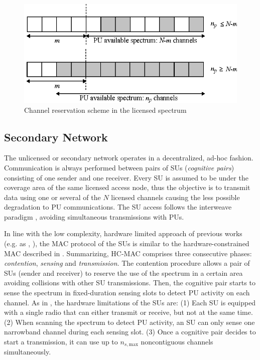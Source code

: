 \begin{figure}[ht]
\centering
\includegraphics[scale=0.9]{channelReservation.eps}
\caption[]{Channel reservation scheme in the licensed spectrum}\label{BR_fig_allocation}
\end{figure}

\subsection{Secondary Network}\label{secondarynetwork}
The unlicensed or secondary network operates in a decentralized, ad-hoc fashion. 
Communication is always performed between pairs of SUs (\textit{cognitive pairs}) consisting of one sender and one receiver.
Every SU is assumed to be under the coverage area of the same licensed access node, thus the objective is to transmit data using one or several of the $N$ licensed channels causing the less possible degradation to PU communications. The SU access follows the interweave paradigm \cite{ref:BookCognitive}, avoiding simultaneous transmissions with PUs.

In line with the low complexity, hardware limited approach of previous works (e.g. \cite{ref:comparativaMAC} as \cite{ref:HCMAC}, \cite{ref:lowComplexity}), the MAC protocol of the SUs is similar to the hardware-constrained MAC described in \cite{ref:HCMAC}.
Summarizing, HC-MAC comprises three consecutive phases: \textit{contention}, \textit{sensing} and \textit{transmission}.
The contention procedure allows a pair of SUs (sender and receiver) to reserve the use of the spectrum in a certain area avoiding collisions with other SU transmissions.
Then, the cognitive pair starts to sense the spectrum in fixed-duration sensing slots to detect PU activity on each channel. 
As in \cite{ref:HCMAC}, the hardware limitations of the SUs are:
(1) Each SU is equipped with a single radio that can either transmit or receive, but not at the same time.
(2) When scanning the spectrum to detect PU activity, an SU can only sense one narrowband channel during each sensing slot.
(3) Once a cognitive pair decides to start a transmission, it can use up to $n_{s,\text{max}}$ noncontiguous channels simultaneously. 

